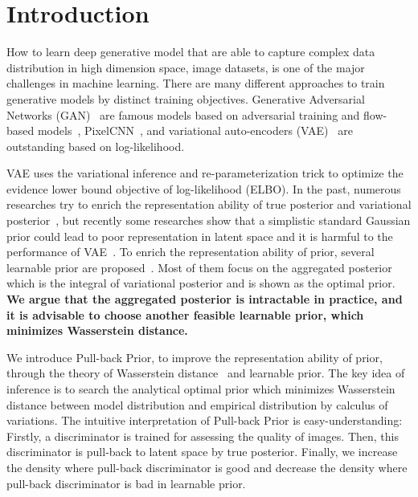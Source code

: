 \section{Introduction}

How to learn deep generative model that are able to capture complex data distribution in high dimension space, \EG image datasets, is one of the major challenges in machine learning. There are many different approaches to train generative models by distinct training objectives. Generative Adversarial Networks (GAN)~\cite{goodfellow2014generative} are famous models based on adversarial training and flow-based models~\cite{dinh2016density,kingma2018glow}, PixelCNN~\cite{van2016conditional}, and variational auto-encoders (VAE)~\cite{kingma2014auto,rezende_stochastic_2014} are outstanding based on log-likelihood. 

VAE uses the variational inference and re-parameterization trick to optimize the evidence lower bound objective of log-likelihood (ELBO). In the past, numerous researches try to enrich the representation ability of true posterior and variational posterior~\cite{kingma2016improved,tomczak2016improving}, but recently some researches show that a simplistic standard Gaussian prior could lead to poor representation in latent space and it is harmful to the performance of VAE~\cite{tomczak2018vae}. To enrich the representation ability of prior, several learnable prior are proposed~\cite{tomczak2018vae,bauer2019resampled,takahashi2019variational}. Most of them focus on the aggregated posterior which is the integral of variational posterior and is shown as the optimal prior. \textbf{We argue that the aggregated posterior is intractable in practice, and it is advisable to choose another feasible learnable prior, which minimizes Wasserstein distance. } 

We introduce Pull-back Prior, to improve the representation ability of prior, through the theory of Wasserstein distance~\cite{arjovsky2017wasserstein} and learnable prior. The key idea of inference is to search the analytical optimal prior which minimizes Wasserstein distance between model distribution and empirical distribution by calculus of variations. 
The intuitive interpretation of Pull-back Prior is easy-understanding: Firstly, a discriminator is trained for assessing the quality of images. Then, this discriminator is pull-back to latent space by true posterior. Finally, we increase the density where pull-back discriminator is good and decrease the density where pull-back discriminator is bad in learnable prior. 

